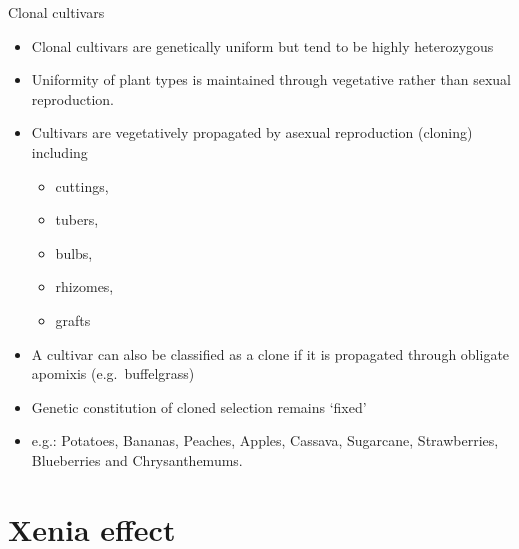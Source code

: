 \documentclass[11pt,ignorenonframetext,aspectratio=169]{beamer}
\providecommand{\tightlist}{%
  \setlength{\itemsep}{0pt}\setlength{\parskip}{0pt}}
\begin{document}
\begin{frame}{Clonal cultivars}
\protect\hypertarget{clonal-cultivars}{}
\begin{itemize}
\tightlist
\item
  Clonal cultivars are genetically uniform but tend to be highly
  heterozygous
\item
  Uniformity of plant types is maintained through vegetative rather than
  sexual reproduction.
\item
  Cultivars are vegetatively propagated by asexual reproduction
  (cloning) including

  \begin{itemize}
  \tightlist
  \item
    cuttings,
  \item
    tubers,
  \item
    bulbs,
  \item
    rhizomes,
  \item
    grafts
  \end{itemize}
\item
  A cultivar can also be classified as a clone if it is propagated
  through obligate apomixis (e.g.~buffelgrass)
\item
  Genetic constitution of cloned selection remains `fixed'
\item
  e.g.: Potatoes, Bananas, Peaches, Apples, Cassava, Sugarcane,
  Strawberries, Blueberries and Chrysanthemums.
\end{itemize}
\end{frame}

\hypertarget{xenia-effect}{%
\section{Xenia effect}\label{xenia-effect}}
\end{document}

